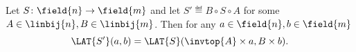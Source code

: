 \begin{proposition}
Let $S\colon \field{n} \to \field{m}$ and let $S' \eqdef B \circ S \circ A$ for some $A \in \linbij{n}, B \in \linbij{m}$. Then for any $a \in \field{n}, b \in \field{m}$
$$
\LAT{S'}(a,b) = \LAT{S}(\invtop{A} \times a, B \times b).
$$
\end{proposition}
